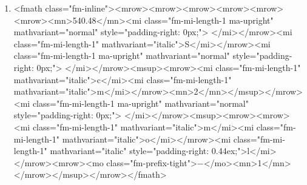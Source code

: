 \documentclass{article}
\begin{document}
\begin{enumerate}[label=(\alph*)]
\item  <fmath class="fm-inline"><mrow><mrow><mrow><mrow><mrow><mrow><mn>540.48</mn><mi class="fm-mi-length-1 ma-upright" mathvariant="normal" style="padding-right: 0px;"> </mi></mrow><mi class="fm-mi-length-1" mathvariant="italic">S</mi></mrow><mi class="fm-mi-length-1 ma-upright" mathvariant="normal" style="padding-right: 0px;"> </mi></mrow><msup><mrow><mi class="fm-mi-length-1" mathvariant="italic">c</mi><mi class="fm-mi-length-1" mathvariant="italic">m</mi></mrow><mn>2</mn></msup></mrow><mi class="fm-mi-length-1 ma-upright" mathvariant="normal" style="padding-right: 0px;"> </mi></mrow><msup><mrow><mrow><mi class="fm-mi-length-1" mathvariant="italic">m</mi><mi class="fm-mi-length-1" mathvariant="italic">o</mi></mrow><mi class="fm-mi-length-1" mathvariant="italic" style="padding-right: 0.44ex;">l</mi></mrow><mrow><mo class="fm-prefix-tight">−</mo><mn>1</mn></mrow></msup></mrow></fmath>
\end{enumerate}
\newpage
\end{document}

